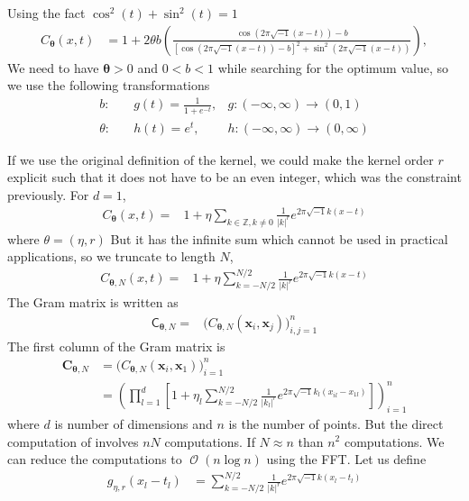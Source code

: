 \documentclass{iitthesis}          %
\DeclareMathOperator{\Order}{{\mathcal O}}
\newcommand{\bm}[1]{\boldsymbol{#1}}
\newcommand{\vtheta}{{\bm{\theta}}}
\newcommand{\vC}{\bm{C}}
\newcommand{\vx}{\bm{x}}
\newcommand{\mC}{\mathsf{C}}
\def\abs#1{\ensuremath{\left \lvert #1 \right \rvert}}
\begin{document}
Using the fact $\cos^2(t) + \sin^2(t) = 1$
\begin{align*}
C_\vtheta(x, t) &= 
1 + 2 \theta b
\left(
\frac{ \cos({2 \pi\sqrt{-1} (x-t) }) - b }
{ \left[\cos({ 2 \pi\sqrt{-1} (x-t)})-b\right]^2 + \sin^2({ 2 \pi\sqrt{-1} (x-t)}) }
\right),
\end{align*}
We need to have $\vtheta > 0$ and $ 0 < b < 1$ while searching for the optimum value, so we use the following transformations
\begin{align*}
b: & \quad g(t) = \frac{1}{1 + e^{-t}}, & g:(-\infty, \infty) \to (0, 1)
\\
\theta: & \quad h(t) = e^{t}, & h:(-\infty, \infty) \to (0, \infty)
\end{align*}


If we use the original definition of the kernel, we could make the kernel order $r$ explicit such that it does not have to be an even integer, which was the constraint previously. For $d=1$,
\begin{align*}
C_\vtheta(x, t) = & 1 + \eta \sum_{k \in \mathbb{Z}, k \neq 0 } \frac{1}{\abs{k}^r} 
e^{ 2 \pi\sqrt{-1} k (x-t)}
\end{align*}
where $\theta = (\eta, r)$
But it has the infinite sum which cannot be used in practical applications, so we truncate to length $N$,
\begin{align*}
C_{\vtheta, N}(x, t) = & 1 + \eta \sum_{k = - N/2 }^{N/2} \frac{1}{\abs{k}^r} 
e^{ 2 \pi\sqrt{-1} k (x-t)}
\end{align*}
The Gram matrix is written as 
\begin{align*}
\mC_{\vtheta, N} = & \biggl( C_{\vtheta, N}(\vx_i, \vx_j) \biggr)_{i,j=1}^n
\end{align*}
The first column of the Gram matrix is
\begin{align*}
\vC_{\vtheta, N} &= \biggl( C_{\vtheta, N}(\vx_i, \vx_1) \biggr)_{i=1}^n
\\
&= \left( \prod_{l=1}^d \left[ 1 + \eta_l \sum_{k = - N/2 }^{N/2} \frac{1}{\abs{k_l}^r} 
e^{ 2 \pi\sqrt{-1} k_l (x_{il}-x_{1l})}\right] \right)_{i=1}^n
\end{align*}
where $d$ is number of dimensions and $n$ is the number of points. 
But the direct computation of involves $nN$ computations. If $N \approx n$ than $n^2$ computations. We can reduce the computations to $\Order(n\log n)$ using the FFT.
Let us define
\begin{align*}
g_{\eta, r}(x_l-t_l) &= \sum_{k = - N/2 }^{N/2} \frac{1}{\abs{k}^r} 
e^{ 2 \pi\sqrt{-1} k (x_l - t_l)}
\end{align*}
\end{document}
